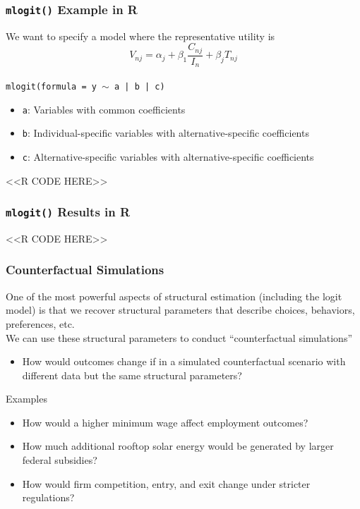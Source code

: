 \documentclass{beamer}
\begin{document}
\begin{frame}[fragile]\frametitle{\texttt{mlogit()} Example in R}
    We want to specify a model where the representative utility is
    $$V_{nj} = \alpha_j + \beta_1 \frac{C_{nj}}{I_n} + \beta_j T_{nj}$$ \\
    \vspace{2ex}
    \texttt{mlogit(formula = y $\sim$ a | b | c)}
    \begin{itemize}
    	\item \texttt{a}: Variables with common coefficients
    	\item \texttt{b}: Individual-specific variables with alternative-specific coefficients
    	\item \texttt{c}: Alternative-specific variables with alternative-specific coefficients
    \end{itemize}
    \vspace{2ex}
    <<R CODE HERE>>
\end{frame}

\begin{frame}[fragile]\frametitle{\texttt{mlogit()} Results in R}
    <<R CODE HERE>>
\end{frame}

\begin{frame}\frametitle{Counterfactual Simulations}
    One of the most powerful aspects of structural estimation (including the logit model) is that we recover structural parameters that describe choices, behaviors, preferences, etc. \\
    \vspace{2ex}
    We can use these structural parameters to conduct ``counterfactual simulations''
    \begin{itemize}
        \item How would outcomes change if in a simulated counterfactual scenario with different data but the same structural parameters?
    \end{itemize}
    \vspace{2ex}
    Examples
    \begin{itemize}
        \item How would a higher minimum wage affect employment outcomes?
        \item How much additional rooftop solar energy would be generated by larger federal subsidies?
        \item How would firm competition, entry, and exit change under stricter regulations?
    \end{itemize}
\end{frame}
\end{document}
